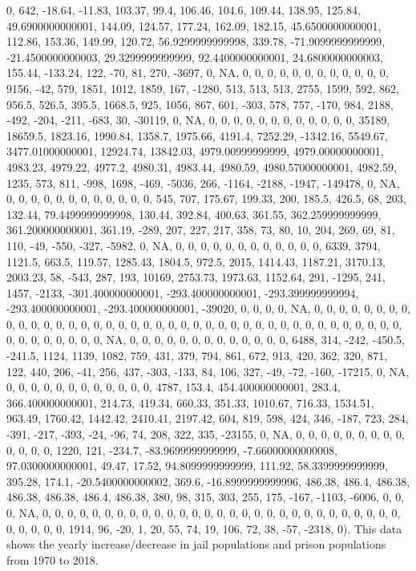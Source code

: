 \documentclass[
]{article}
\begin{document}
0, 642, -18.64, -11.83, 103.37, 99.4, 106.46, 104.6, 109.44, 138.95,
125.84, 49.6900000000001, 144.09, 124.57, 177.24, 162.09, 182.15,
45.6500000000001, 112.86, 153.36, 149.99, 120.72, 56.9299999999998,
339.78, -71.9099999999999, -21.4500000000003, 29.3299999999999,
92.4400000000001, 24.6800000000003, 155.44, -133.24, 122, -70, 81, 270,
-3697, 0, NA, 0, 0, 0, 0, 0, 0, 0, 0, 0, 0, 0, 0, 9156, -42, 579, 1851,
1012, 1859, 167, -1280, 513, 513, 513, 2755, 1599, 592, 862, 956.5,
526.5, 395.5, 1668.5, 925, 1056, 867, 601, -303, 578, 757, -170, 984,
2188, -492, -204, -211, -683, 30, -30119, 0, NA, 0, 0, 0, 0, 0, 0, 0, 0,
0, 0, 0, 0, 35189, 18659.5, 1823.16, 1990.84, 1358.7, 1975.66, 4191.4,
7252.29, -1342.16, 5549.67, 3477.01000000001, 12924.74, 13842.03,
4979.00999999999, 4979.00000000001, 4983.23, 4979.22, 4977.2, 4980.31,
4983.44, 4980.59, 4980.57000000001, 4982.59, 1235, 573, 811, -998, 1698,
-469, -5036, 266, -1164, -2188, -1947, -149478, 0, NA, 0, 0, 0, 0, 0, 0,
0, 0, 0, 0, 0, 0, 545, 707, 175.67, 199.33, 200, 185.5, 426.5, 68, 203,
132.44, 79.4499999999998, 130.44, 392.84, 400.63, 361.55,
362.259999999999, 361.200000000001, 361.19, -289, 207, 227, 217, 358,
73, 80, 10, 204, 269, 69, 81, 110, -49, -550, -327, -5982, 0, NA, 0, 0,
0, 0, 0, 0, 0, 0, 0, 0, 0, 0, 6339, 3794, 1121.5, 663.5, 119.57,
1285.43, 1804.5, 972.5, 2015, 1414.43, 1187.21, 3170.13, 2003.23, 58,
-543, 287, 193, 10169, 2753.73, 1973.63, 1152.64, 291, -1295, 241, 1457,
-2133, -301.400000000001, -293.400000000001, -293.399999999994,
-293.400000000001, -293.400000000001, -39020, 0, 0, 0, 0, NA, 0, 0, 0,
0, 0, 0, 0, 0, 0, 0, 0, 0, 0, 0, 0, 0, 0, 0, 0, 0, 0, 0, 0, 0, 0, 0, 0,
0, 0, 0, 0, 0, 0, 0, 0, 0, 0, 0, 0, 0, 0, 0, 0, 0, 0, 0, 0, 0, NA, 0, 0,
0, 0, 0, 0, 0, 0, 0, 0, 0, 0, 0, 6488, 314, -242, -450.5, -241.5, 1124,
1139, 1082, 759, 431, 379, 794, 861, 672, 913, 420, 362, 320, 871, 122,
440, 206, -41, 256, 437, -303, -133, 84, 106, 327, -49, -72, -160,
-17215, 0, NA, 0, 0, 0, 0, 0, 0, 0, 0, 0, 0, 0, 0, 4787, 153.4,
454.400000000001, 283.4, 366.400000000001, 214.73, 419.34, 660.33,
351.33, 1010.67, 716.33, 1534.51, 963.49, 1760.42, 1442.42, 2410.41,
2197.42, 604, 819, 598, 424, 346, -187, 723, 284, -391, -217, -393, -24,
-96, 74, 208, 322, 335, -23155, 0, NA, 0, 0, 0, 0, 0, 0, 0, 0, 0, 0, 0,
0, 0, 1220, 121, -234.7, -83.9699999999999, -7.66000000000008,
97.0300000000001, 49.47, 17.52, 94.8099999999999, 111.92,
58.3399999999999, 395.28, 174.1, -20.5400000000002, 369.6,
-16.8999999999996, 486.38, 486.4, 486.38, 486.38, 486.38, 486.4, 486.38,
380, 98, 315, 303, 255, 175, -167, -1103, -6006, 0, 0, 0, NA, 0, 0, 0,
0, 0, 0, 0, 0, 0, 0, 0, 0, 0, 0, 0, 0, 0, 0, 0, 0, 0, 0, 0, 0, 0, 0, 0,
0, 0, 0, 0, 0, 0, 0, 1914, 96, -20, 1, 20, 55, 74, 19, 106, 72, 38, -57,
-2318, 0). This data shows the yearly increase/decrease in jail
populations and prison populations from 1970 to 2018.
\end{document}
